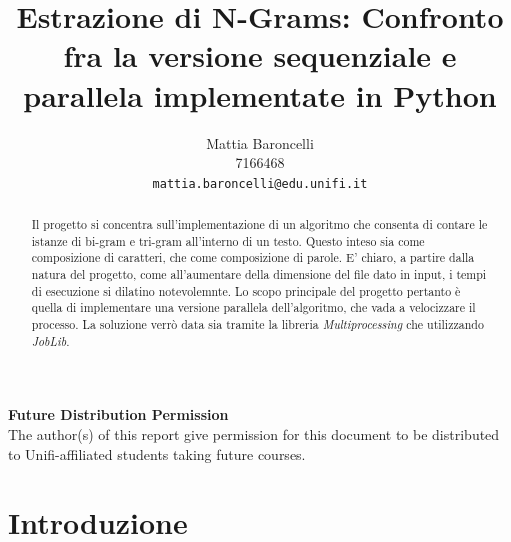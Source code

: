 \documentclass[10pt,twocolumn,letterpaper]{article}
\begin{document}
\title{Estrazione di N-Grams: Confronto fra la versione sequenziale e parallela implementate in Python}

\author{Mattia Baroncelli\\
7166468\\
{\tt\small mattia.baroncelli@edu.unifi.it}
}

\maketitle
\thispagestyle{empty}

\begin{abstract}
   Il progetto si concentra sull'implementazione di un algoritmo che consenta di contare le istanze di bi-gram e tri-gram all'interno di un testo. Questo inteso sia come composizione di caratteri, che come composizione di parole. E' chiaro, a partire dalla natura del progetto, come all'aumentare della dimensione del file dato in input, i tempi di esecuzione si dilatino notevolemnte.
   Lo scopo principale del progetto pertanto è quella di implementare una versione parallela dell'algoritmo, che vada a velocizzare il processo. La soluzione verrò data sia tramite la libreria \textit{Multiprocessing} che utilizzando \textit{JobLib}.
\end{abstract}

\noindent\textbf{Future Distribution Permission}\\
\indent The author(s) of this report give permission for this document to be distributed to Unifi-affiliated students taking future courses.

\section{Introduzione}
\end{document}
